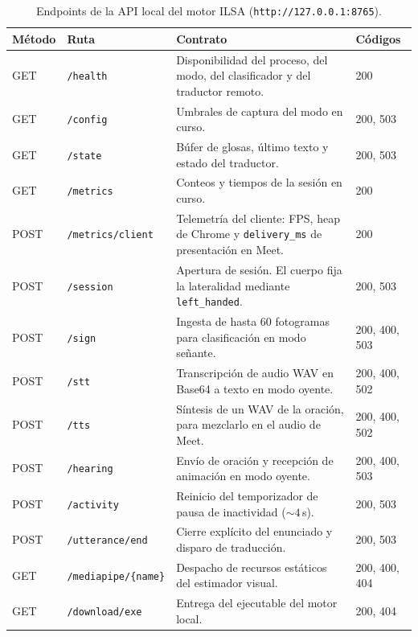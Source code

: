 \begin{table}[H]
  \centering
  \caption{Endpoints de la API local del motor ILSA (\texttt{http://127.0.0.1:8765}).}
  \label{tab:api-ilsa-local}
  \scriptsize
  \setlength{\tabcolsep}{3pt}
  \begin{tabularx}{\textwidth}{|>{\raggedright\arraybackslash\hspace{0pt}}p{1.35cm}|>{\raggedright\arraybackslash\hspace{0pt}}p{3.3cm}|>{\raggedright\arraybackslash\hspace{0pt}}X|>{\raggedright\arraybackslash\hspace{0pt}}p{1.9cm}|}
    \hline
    \textbf{Método} & \textbf{Ruta} & \textbf{Contrato} & \textbf{Códigos} \\ \hline
    GET & \texttt{/health} & Disponibilidad del proceso, del modo, del clasificador y del traductor remoto. & 200 \\ \hline
    GET & \texttt{/config} & Umbrales de captura del modo en curso. & 200, 503 \\ \hline
    GET & \texttt{/state} & Búfer de glosas, último texto y estado del traductor. & 200, 503 \\ \hline
    GET & \texttt{/metrics} & Conteos y tiempos de la sesión en curso. & 200 \\ \hline
    POST & \texttt{/metrics/\allowbreak client} & Telemetría del cliente: FPS, heap de Chrome y \texttt{delivery\_ms} de presentación en Meet. & 200 \\ \hline
    POST & \texttt{/session} & Apertura de sesión. El cuerpo fija la lateralidad mediante \texttt{left\_handed}. & 200, 503 \\ \hline
    POST & \texttt{/sign} & Ingesta de hasta 60 fotogramas para clasificación en modo señante. & 200, 400, 503 \\ \hline
    POST & \texttt{/stt} & Transcripción de audio WAV en Base64 a texto en modo oyente. & 200, 400, 502 \\ \hline
    POST & \texttt{/tts} & Síntesis de un WAV de la oración, para mezclarlo en el audio de Meet. & 200, 400, 502 \\ \hline
    POST & \texttt{/hearing} & Envío de oración y recepción de animación en modo oyente. & 200, 400, 503 \\ \hline
    POST & \texttt{/activity} & Reinicio del temporizador de pausa de inactividad ($\sim 4$\,s). & 200, 503 \\ \hline
    POST & \texttt{/utterance/\allowbreak end} & Cierre explícito del enunciado y disparo de traducción. & 200, 503 \\ \hline
    GET & \texttt{/mediapipe/\allowbreak \{name\}} & Despacho de recursos estáticos del estimador visual. & 200, 400, 404 \\ \hline
    GET & \texttt{/download/exe} & Entrega del ejecutable del motor local. & 200, 404 \\ \hline
  \end{tabularx}
\end{table}

